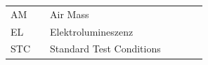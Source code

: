 \documentclass[a4paper,bibtotoc,oneside]{scrbook}
\begin{document}





\listoffigures
{} %
\newpage

\listoftables 
{} %
\newpage

\hspace{-17mm}\begin{tabular}{>{\raggedleft}p{0.2\linewidth} p{0.75\linewidth} p{0.1\linewidth}}
AM & Air Mass \\
EL & Elektrolumineszenz \\
STC & Standard Test Conditions
\end{tabular}
\end{document}
